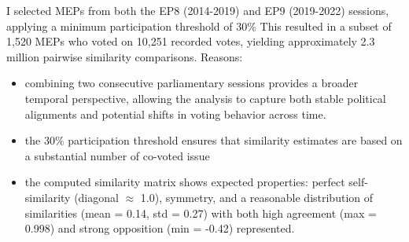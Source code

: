 \documentclass[a4paper]{scrartcl}
\begin{document}
I selected MEPs from both the EP8 (2014-2019) and EP9 (2019-2022) sessions, applying a minimum participation threshold of 30\% This resulted in a subset of 1,520 MEPs who voted on 10,251 recorded votes, yielding approximately 2.3 million pairwise similarity comparisons.
Reasons:
\begin{itemize}
    \item combining two consecutive parliamentary sessions provides a broader temporal perspective, allowing the analysis to capture both stable political alignments and potential shifts in voting behavior across time.
    \item the 30\% participation threshold ensures that similarity estimates are based on a substantial number of co-voted issue
    \item the computed similarity matrix shows expected properties: perfect self-similarity (diagonal \(\approx\) 1.0), symmetry, and a reasonable distribution of similarities (mean = 0.14, std = 0.27) with both high agreement (max = 0.998) and strong opposition (min = -0.42) represented.
\end{itemize}
\end{document}

